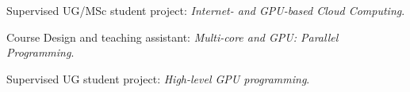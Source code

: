 \begin{cvitemize}[\small 2010 - 2011]
    \item Supervised UG/MSc student project:
        \emph{Internet- and GPU-based Cloud Computing}.
      \item Course Design and teaching assistant:
        \emph{Multi-core and GPU\@: Parallel Programming}.
    \item Supervised UG student project:
        \emph{High-level GPU programming}.
\end{cvitemize}